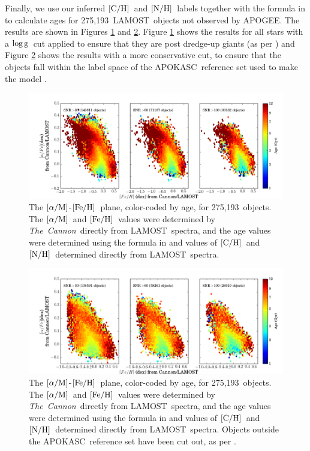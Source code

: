 \documentclass[12pt, preprint]{aastex}
\newcommand{\tc}{\textsl{The~Cannon}}
\newcommand{\apogee}{APOGEE}
\newcommand{\lamost}{LAMOST}
\newcommand{\apokasc}{APOKASC}
\newcommand{\logg}{\mbox{$\rm \log g$}}
\newcommand{\feh}{\mbox{$\rm [Fe/H]$}}
\newcommand{\alpham}{\mbox{$\rm [\alpha/M]$}}
\newcommand{\carbon}{\mbox{$\rm [C/H]$}}
\newcommand{\nitrogen}{\mbox{$\rm [N/H]$}}
\newcommand{\ntestobj}{275,193}
\begin{document}
Finally, we use our inferred \carbon\ and \nitrogen\ 
labels together with the formula in \citet{Martig2016}
to calculate ages for \ntestobj\ \lamost\ objects not observed by \apogee.
The results are shown in Figures \ref{fig:feh-alpha-logg}
and \ref{fig:feh-alpha}. 
Figure \ref{fig:feh-alpha-logg} shows the results
for all stars with a \logg\ cut applied to ensure that they
are post dredge-up giants (as per \citet{Martig2016})
and Figure \ref{fig:feh-alpha} shows the results with
a more conservative cut, to ensure that the objects
fall within the label space of the \apokasc\ reference set
used to make the model \citep{Martig2016}. 

\begin{figure}[ht!]
\centering
\includegraphics[scale=0.5]{feh_alpha_logg_all.png}
\caption{
The \alpham-\feh\ plane, color-coded by age, 
for \ntestobj\ objects. The \alpham\ and \feh\ values
were determined by \tc\ directly from \lamost\ spectra,
and the age values were determined using the formula
in \citet{Martig2016} and values of \carbon\ and \nitrogen\ 
determined directly from \lamost\ spectra.
}
\label{fig:feh-alpha-logg}
\end{figure}

\begin{figure}[ht!]
\centering
\includegraphics[scale=0.5]{feh_alpha_all.png}
\caption{
The \alpham-\feh\ plane, color-coded by age, 
for \ntestobj\ objects. The \alpham\ and \feh\ values
were determined by \tc\ directly from \lamost\ spectra,
and the age values were determined using the formula
in \citet{Martig2016} and values of \carbon\ and \nitrogen\ 
determined directly from \lamost\ spectra.
Objects outside the \apokasc\ reference set
have been cut out, as per \citet{Martig2016}.
}
\label{fig:feh-alpha}
\end{figure}
\end{document}
